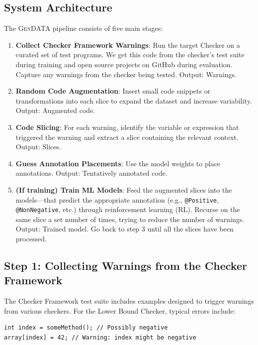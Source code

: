 \documentclass[acmsmall,screen,review,anonymous]{acmart}
\makeatletter
\newcommand{\gendata}{\textsc{GenDATA}\xspace}
\newcommand{\cf}{Checker Framework\xspace}
\newcommand{\atmark}[1]{\texttt{@#1}}
\makeatother
\begin{document}
\subsection{System Architecture}
\label{sec:architecture}

The \gendata pipeline consists of five main stages:

\begin{enumerate}
    \item \textbf{Collect \cf Warnings}: Run the target Checker on a curated set of test programs. We get this code from the checker's test suite during training and open source projects on GitHub during evaluation. Capture any warnings from the checker being tested. Output: Warnings.
    
    \item \textbf{Random Code Augmentation}: Insert small code snippets or transformations into each slice to expand the dataset and increase variability. Output: Augmented code.
    
    \item \textbf{Code Slicing}: For each warning, identify the variable or expression that triggered the warning and extract a slice containing the relevant context. Output: Slices.
    
    \item \textbf{Guess Annotation Placements}: Use the model weights to place annotations. Output: Tentatively annotated code.
    
    \item \textbf{(If training) Train ML Models}: Feed the augmented slices into the models---that predict the appropriate annotation (e.g., \atmark{Positive}, \atmark{NonNegative}, etc.) through reinforcement learning (RL). Recurse on the same slice a set number of times, trying to reduce the number of warnings. Output: Trained model. Go back to step 3 until all the slices have been processed.
\end{enumerate}

\subsection{Step 1: Collecting Warnings from the \cf}
\label{sec:collecting}

The \cf test suite includes examples designed to trigger warnings from various checkers. For the Lower Bound Checker, typical errors include:

\begin{lstlisting}
int index = someMethod(); // Possibly negative
array[index] = 42; // Warning: index might be negative
\end{lstlisting}
\end{document}

